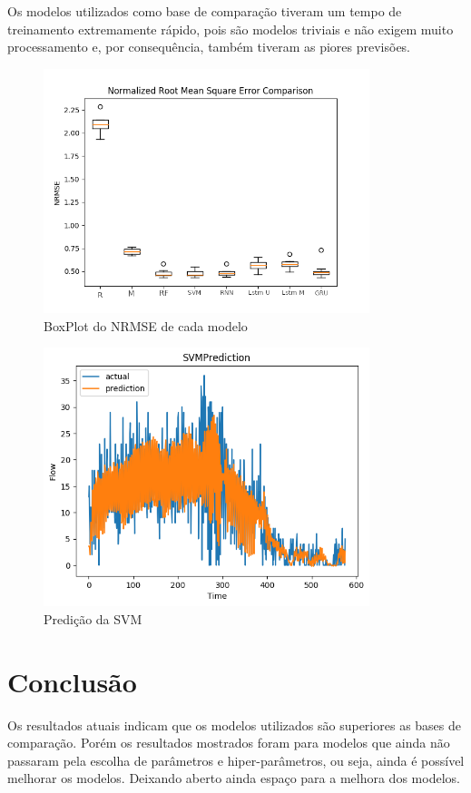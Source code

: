 \documentclass[conference]{IEEEtran}
\begin{document}
Os modelos utilizados como base de comparação tiveram um tempo de treinamento extremamente rápido, pois são modelos triviais e não exigem muito processamento e, por consequência, também tiveram as piores previsões.

\begin{figure}[!htb]
     \centering
     \includegraphics[width=9.5cm,keepaspectratio]{NrmseEditado.png}
     \caption{BoxPlot do NRMSE de cada modelo}
     \label{fig:BoxPlot NRMSE}
\end{figure}

\begin{figure}[!htb]
     \centering
     \includegraphics[width=9.5cm,keepaspectratio]{svm.png}
     \caption{Predição da SVM}
     \label{fig:pred_svm}
\end{figure}

\section{Conclusão}

Os resultados atuais indicam que os modelos utilizados são superiores as bases de comparação. Porém os resultados mostrados foram para modelos que ainda não passaram pela escolha de parâmetros e hiper-parâmetros, ou seja, ainda é possível melhorar os modelos. Deixando aberto ainda espaço para a melhora dos modelos.
\end{document}
